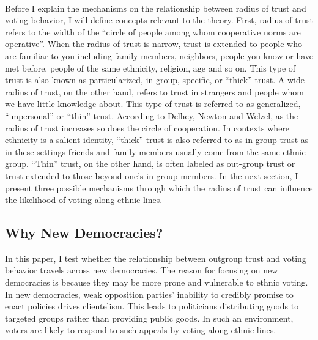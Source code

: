 \documentclass[a4paper, 12pt]{article}
\begin{document}
\paragraph{}
Before I explain the mechanisms on the relationship between radius of trust and voting behavior, I will define concepts relevant to the theory. First, radius of trust refers to the width of the “circle of people among whom cooperative norms are operative”\cite{fukuyamaTrustSocialVirtues2000}. When the radius of trust is narrow, trust is extended to people who are familiar to you including family members, neighbors, people you know or have met before, people of the same ethnicity, religion, age and so on. This type of trust is also known as particularized, in-group, specific, or “thick” trust\cite{zmerliSocialTrustAttitudes2008, delheyHowGeneralTrust2011}. A wide radius of trust, on the other hand, refers to trust in strangers and people whom we have little knowledge about. This type of trust is referred to as generalized, “impersonal” or “thin” trust\cite{gaidyteExplainingPoliticalParticipation2015}. According to Delhey, Newton and Welzel\cite{delheyHowGeneralTrust2011}, as the radius of trust increases so does the circle of cooperation. In contexts where ethnicity is a salient identity, “thick” trust is also referred to as in-group trust as in these settings friends and family members usually come from the same ethnic group. “Thin” trust, on the other hand, is often labeled as out-group trust or trust extended to those beyond one’s in-group members. In the next section, I present three possible mechanisms through which the radius of trust can influence the likelihood of voting along ethnic lines. 
\subsection{Why New Democracies?}
In this paper, I test whether the relationship between outgroup trust and voting behavior travels across new democracies. The reason for focusing on new democracies is because they may be more prone and vulnerable to ethnic voting. In new democracies, weak opposition parties’ inability to credibly promise to enact policies drives clientelism\cite{keeferClientelismCredibilityPolicy2007a}. This leads to politicians distributing goods to targeted groups rather than providing public goods. In such an environment, voters are likely to respond to such appeals by voting along ethnic lines.
\end{document}
